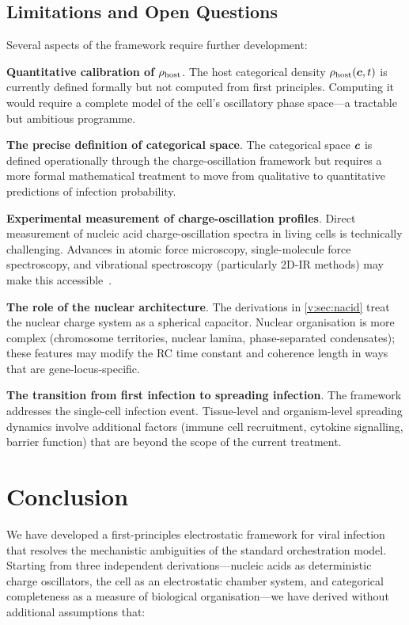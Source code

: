 \subsection{Limitations and Open Questions}

Several aspects of the framework require further development:

\textbf{Quantitative calibration of $\rho_{\mathrm{host}}$}. The host categorical density $\rho_{\mathrm{host}}(\boldsymbol{c}, t)$ is currently defined formally but not computed from first principles. Computing it would require a complete model of the cell's oscillatory phase space---a tractable but ambitious programme.

\textbf{The precise definition of categorical space}. The categorical space $\boldsymbol{c}$ is defined operationally through the charge-oscillation framework but requires a more formal mathematical treatment to move from qualitative to quantitative predictions of infection probability.

\textbf{Experimental measurement of charge-oscillation profiles}. Direct measurement of nucleic acid charge-oscillation spectra in living cells is technically challenging. Advances in atomic force microscopy, single-molecule force spectroscopy, and vibrational spectroscopy (particularly 2D-IR methods) may make this accessible~\cite{Boxer2009,Oklejas2002}.

\textbf{The role of the nuclear architecture}. The derivations in \cref{v:sec:nacid} treat the nuclear charge system as a spherical capacitor. Nuclear organisation is more complex (chromosome territories, nuclear lamina, phase-separated condensates); these features may modify the RC time constant and coherence length in ways that are gene-locus-specific.

\textbf{The transition from first infection to spreading infection}. The framework addresses the single-cell infection event. Tissue-level and organism-level spreading dynamics involve additional factors (immune cell recruitment, cytokine signalling, barrier function) that are beyond the scope of the current treatment.

\section{Conclusion}
\label{v:sec:conclusion}

We have developed a first-principles electrostatic framework for viral infection that resolves the mechanistic ambiguities of the standard orchestration model. Starting from three independent derivations---nucleic acids as deterministic charge oscillators, the cell as an electrostatic chamber system, and categorical completeness as a measure of biological organisation---we have derived without additional assumptions that:

